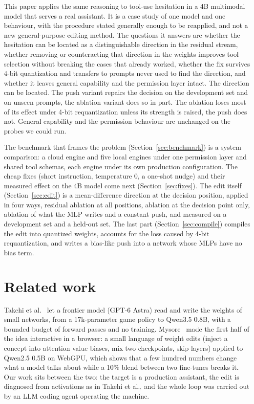 \documentclass[11pt]{article}
\begin{document}
This paper applies the same reasoning to tool-use hesitation in a 4B multimodal model that serves a real assistant. It is a case study of one model and one behaviour, with the procedure stated generally enough to be reapplied, and not a new general-purpose editing method. The questions it answers are whether the hesitation can be located as a distinguishable direction in the residual stream, whether removing or counteracting that direction in the weights improves tool selection without breaking the cases that already worked, whether the fix survives 4-bit quantization and transfers to prompts never used to find the direction, and whether it leaves general capability and the permission layer intact. The direction can be located. The push variant repairs the decision on the development set and on unseen prompts, the ablation variant does so in part. The ablation loses most of its effect under 4-bit requantization unless its strength is raised, the push does not. General capability and the permission behaviour are unchanged on the probes we could run.

The benchmark that frames the problem (Section~\ref{sec:benchmark}) is a system comparison: a cloud engine and five local engines under one permission layer and shared tool schemas, each engine under its own production configuration. The cheap fixes (short instruction, temperature 0, a one-shot nudge) and their measured effect on the 4B model come next (Section~\ref{sec:fixes}). The edit itself (Section~\ref{sec:edit}) is a mean-difference direction at the decision position, applied in four ways, residual ablation at all positions, ablation at the decision point only, ablation of what the MLP writes and a constant push, and measured on a development set and a held-out set. The last part (Section~\ref{sec:compile}) compiles the edit into quantized weights, accounts for the loss caused by 4-bit requantization, and writes a bias-like push into a network whose MLPs have no bias term.

\section{Related work}

Takehi et al.~\citep{takehi2026weightspace} let a frontier model (GPT-6 Astra) read and write the weights of small networks, from a 17k-parameter game policy to Qwen3.5 0.8B, with a bounded budget of forward passes and no training. Mysore~\citep{mysore2026webweightspace} made the first half of the idea interactive in a browser: a small language of weight edits (inject a concept into attention value biases, mix two checkpoints, skip layers) applied to Qwen2.5 0.5B on WebGPU, which shows that a few hundred numbers change what a model talks about while a 10\% blend between two fine-tunes breaks it. Our work sits between the two: the target is a production assistant, the edit is diagnosed from activations as in Takehi et al., and the whole loop was carried out by an LLM coding agent operating the machine.
\end{document}
